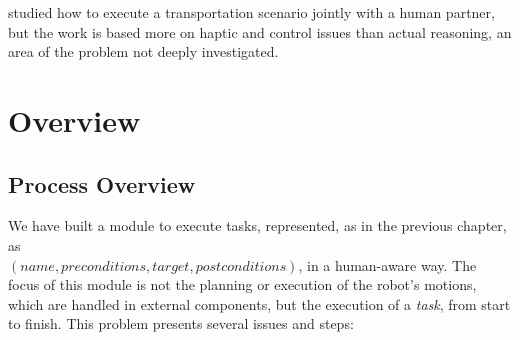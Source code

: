 \cite{bussy2012proactive} studied how to execute a transportation scenario jointly with a human partner, but the work is based more on haptic and control issues than actual reasoning, an area of the problem not deeply investigated.


\section{Overview}
\label{sec:task_execution-overview}

\subsection{Process Overview}

We have built a module to execute tasks, represented, as in the previous chapter, as \\ $(name, preconditions, target, postconditions)$, in a human-aware way. The focus of this module is not the planning or execution of the robot's motions, which are handled in external components, but the  execution of a \textit{task}, from start to finish. This problem presents several issues and steps:

